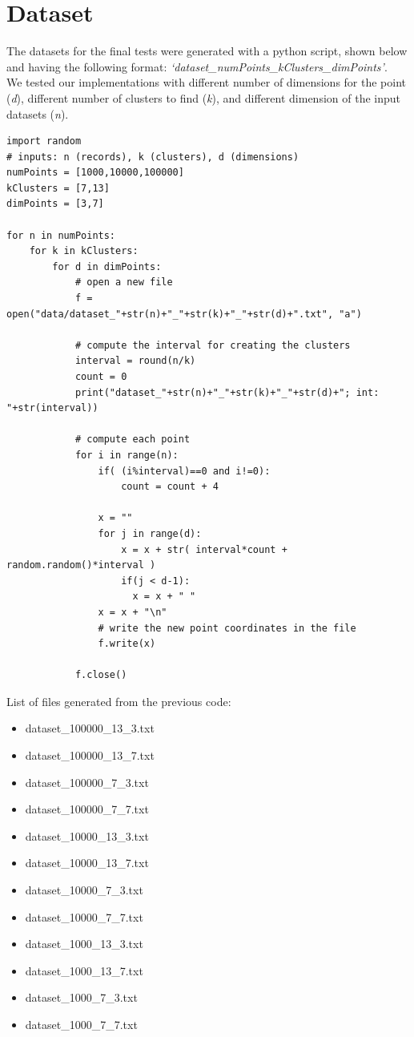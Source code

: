 \documentclass[a4paper, oneside]{article}
\begin{document}
\section{Dataset}
The datasets for the final tests were generated with a python script, shown below and having the following format: \textit{`dataset\_numPoints\_kClusters\_dimPoints'}.\\
We tested our implementations with different number of dimensions for the point (\textit{d}), different number of clusters to find (\textit{k}), and different dimension of the input datasets (\textit{n}).

\begin{verbatim}
import random
# inputs: n (records), k (clusters), d (dimensions)
numPoints = [1000,10000,100000]
kClusters = [7,13]
dimPoints = [3,7]

for n in numPoints:
    for k in kClusters:
        for d in dimPoints:
            # open a new file
            f = open("data/dataset_"+str(n)+"_"+str(k)+"_"+str(d)+".txt", "a")
            
            # compute the interval for creating the clusters
            interval = round(n/k)
            count = 0
            print("dataset_"+str(n)+"_"+str(k)+"_"+str(d)+"; int: "+str(interval))
            
            # compute each point
            for i in range(n):
                if( (i%interval)==0 and i!=0):
                    count = count + 4
                
                x = ""
                for j in range(d):
                    x = x + str( interval*count + random.random()*interval )
                    if(j < d-1):
                      x = x + " "
                x = x + "\n"
                # write the new point coordinates in the file
                f.write(x)
            
            f.close()
\end{verbatim}

\vspace{4mm}
List of files generated from the previous code:
\begin{itemize}
\item dataset\_100000\_13\_3.txt
\item dataset\_100000\_13\_7.txt
\item dataset\_100000\_7\_3.txt
\item dataset\_100000\_7\_7.txt
\item dataset\_10000\_13\_3.txt
\item dataset\_10000\_13\_7.txt
\item dataset\_10000\_7\_3.txt
\item dataset\_10000\_7\_7.txt
\item dataset\_1000\_13\_3.txt
\item dataset\_1000\_13\_7.txt
\item dataset\_1000\_7\_3.txt
\item dataset\_1000\_7\_7.txt 
\end{itemize}
\end{document}
